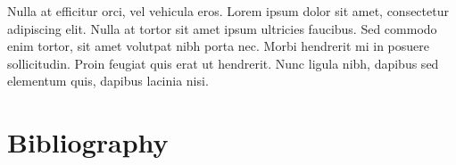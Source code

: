 \documentclass[12pt,a4paper,english,onecolumn]{IEEEtran}
\begin{document}
Nulla at efficitur orci, vel vehicula eros. Lorem ipsum dolor sit amet, consectetur adipiscing elit. Nulla at tortor sit amet ipsum ultricies faucibus. Sed commodo enim tortor, sit amet volutpat nibh porta nec. Morbi hendrerit mi in posuere sollicitudin. Proin feugiat quis erat ut hendrerit. Nunc ligula nibh, dapibus sed elementum quis, dapibus lacinia nisi. 

\section{Bibliography}
\nocite{*}
\printbibliography[heading=none]
\end{document}
